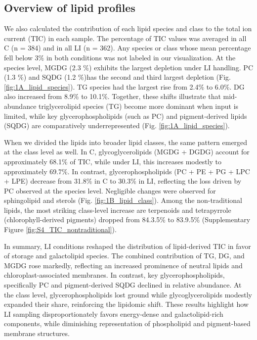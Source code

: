 \documentclass[10pt,letterpaper]{article}
\begin{document}
\subsection*{Overview of lipid profiles}
We also calculated the contribution of each lipid species and class to the total ion current (TIC) in each sample. The percentage of TIC values was averaged in all C (n = 384) and in all LI (n = 362). Any species or class whose mean percentage fell below 3\% in both conditions was not labeled in our visualization. At the species level, MGDG (2.3 \%) exhibits the largest depletion under LI handling. PC (1.3 \%) and  SQDG (1.2 \%)has the second and third largest depletion (Fig. \ref{fig:1A_lipid_species}). TG species had the largest rise from 2.4\% to 6.0\%. DG also increased from 8.9\% to 10.1\%. Together, these shifts illustrate that mid-abundance triglycerolipid species (TG) become more dominant when input is limited, while key glycerophospholipids (such as PC) and pigment‐derived lipids (SQDG) are comparatively underrepresented (Fig. \ref{fig:1A_lipid_species}).

When we divided the lipids into broader lipid classes, the same pattern emerged at the class level as well. In C, glycoglycerolipids (MGDG + DGDG) account for approximately 68.1\% of TIC, while under LI, this increases modestly to approximately 69.7\%. In contrast, glycerophospholipids (PC + PE + PG + LPC + LPE) decrease from 31.8\% in C to 30.3\% in LI, reflecting the loss driven by PC observed at the species level. Negligible changes were observed for sphingolipid and sterols (Fig. \ref{fig:1B_lipid_class}). Among the non-traditional lipids, the most striking class-level increase are terpenoids and tetrapyrrole  (chlorophyll-derived pigments) dropped from 84.3.5\% to 83.9.5\% (Supplementary Figure \ref{fig:S4_TIC_nontraditional}).

In summary, LI conditions reshaped the distribution of lipid-derived TIC in favor of storage and galactolipid species. The combined contribution of TG, DG, and MGDG rose markedly, reflecting an increased prominence of neutral lipids and chloroplast-associated membranes. In contrast, key glycerophospholipids, specifically PC and pigment-derived SQDG declined in relative abundance. At the class level, glycerophospholipids lost ground while glycoglycerolipids modestly expanded their share, reinforcing the lipidomic shift. These results highlight how LI sampling disproportionately favors energy-dense and galactolipid-rich components, while diminishing representation of phospholipid and pigment-based membrane structures.
\end{document}
